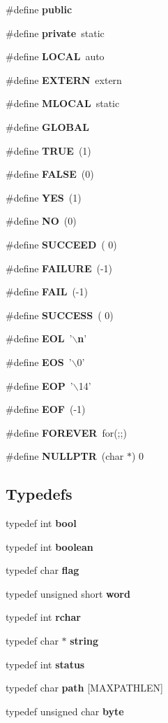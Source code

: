\begin{CompactItemize}
\item 
\#define {\bf public}
\item 
\#define {\bf private}\ static
\item 
\#define {\bf LOCAL}\ auto
\item 
\#define {\bf EXTERN}\ extern
\item 
\#define {\bf MLOCAL}\ static
\item 
\#define {\bf GLOBAL}
\item 
\#define {\bf TRUE}\ (1)
\item 
\#define {\bf FALSE}\ (0)
\item 
\#define {\bf YES}\ (1)
\item 
\#define {\bf NO}\ (0)
\item 
\#define {\bf SUCCEED}\ ( 0)
\item 
\#define {\bf FAILURE}\ (-1)
\item 
\#define {\bf FAIL}\ (-1)
\item 
\#define {\bf SUCCESS}\ ( 0)
\item 
\#define {\bf EOL}\ '$\backslash${\bf n}'
\item 
\#define {\bf EOS}\ '$\backslash$0'
\item 
\#define {\bf EOP}\ '$\backslash$14'
\item 
\#define {\bf EOF}\ (-1)
\item 
\#define {\bf FOREVER}\ for(;;)
\item 
\#define {\bf NULLPTR}\ (char $\ast$) 0
\end{CompactItemize}
\subsection*{Typedefs}
\begin{CompactItemize}
\item 
typedef int {\bf bool}
\item 
typedef int {\bf boolean}
\item 
typedef char {\bf flag}
\item 
typedef unsigned short {\bf word}
\item 
typedef int {\bf rchar}
\item 
typedef char $\ast$ {\bf string}
\item 
typedef int {\bf status}
\item 
typedef char {\bf path} [MAXPATHLEN]
\item 
typedef unsigned char {\bf byte}
\end{CompactItemize}


